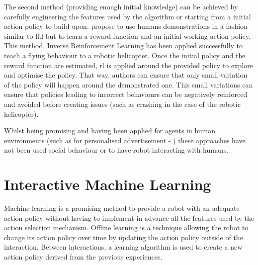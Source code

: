 	The second method (providing enough initial knowledge) can be achieved by carefully engineering the features used by the algorithm or starting from a initial action policy to build upon. \cite{Abbeel2004} propose to use humans demonstrations in a fashion similar to \gls{lfd} but to learn a reward function and an initial working action policy. This method, Inverse Reinforcement Learning has been applied successfully to teach a flying behaviour to a robotic helicopter. Once the initial policy and the reward function are estimated, \gls{rl} is applied around the provided policy to explore and optimise the policy. That way, authors can ensure that only small variation of the policy will happen around the demonstrated one. This small variations can ensure that policies leading to incorrect behaviours can be negatively reinforced and avoided before creating issues (such as crashing in the case of the robotic helicopter).
	
	
	Whilst being promising and having been applied for agents in human environments (such as for personalised advertisement - \citealt{theocharous2015personalized})	these approaches have not been used social behaviour or to have robot interacting with humans.

\section{Interactive Machine Learning} \label{sec:back_iml}

Machine learning is a promising method to provide a robot with an adequate action policy without having to implement in advance all the features used by the action selection mechanism. Offline learning is a technique allowing the robot to change its action policy over time by updating the action policy outside of the interaction. Between interactions, a learning algorithm is used to create a new action policy derived from the previous experiences.

